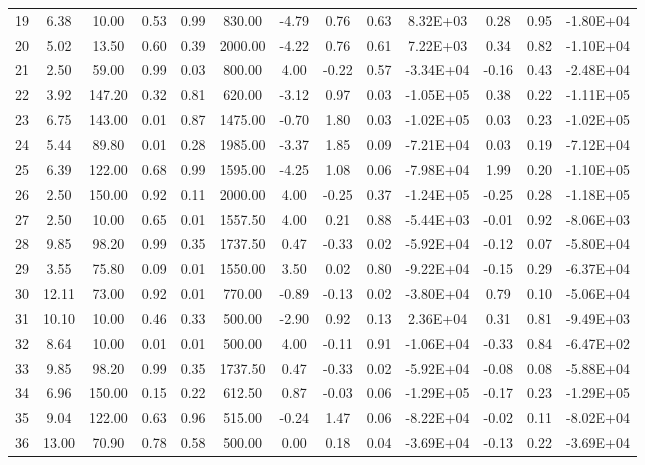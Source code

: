 \begin{landscape}
\begin{center}
\begin{longtable}{|c|c|c|c|c|c|c|c|c|c|c|c|c|}
19 & 6.38  & 10.00  & 0.53 & 0.99 & 830.00  & -4.79 & 0.76  & 0.63 & 8.32E+03  & 0.28  & 0.95 & -1.80E+04 \\
20 & 5.02  & 13.50  & 0.60 & 0.39 & 2000.00 & -4.22 & 0.76  & 0.61 & 7.22E+03  & 0.34  & 0.82 & -1.10E+04 \\
21 & 2.50  & 59.00  & 0.99 & 0.03 & 800.00  & 4.00  & -0.22 & 0.57 & -3.34E+04 & -0.16 & 0.43 & -2.48E+04 \\
22 & 3.92  & 147.20 & 0.32 & 0.81 & 620.00  & -3.12 & 0.97  & 0.03 & -1.05E+05 & 0.38  & 0.22 & -1.11E+05 \\
23 & 6.75  & 143.00 & 0.01 & 0.87 & 1475.00 & -0.70 & 1.80  & 0.03 & -1.02E+05 & 0.03  & 0.23 & -1.02E+05 \\
24 & 5.44  & 89.80  & 0.01 & 0.28 & 1985.00 & -3.37 & 1.85  & 0.09 & -7.21E+04 & 0.03  & 0.19 & -7.12E+04 \\
25 & 6.39  & 122.00 & 0.68 & 0.99 & 1595.00 & -4.25 & 1.08  & 0.06 & -7.98E+04 & 1.99  & 0.20 & -1.10E+05 \\
26 & 2.50  & 150.00 & 0.92 & 0.11 & 2000.00 & 4.00  & -0.25 & 0.37 & -1.24E+05 & -0.25 & 0.28 & -1.18E+05 \\
27 & 2.50  & 10.00  & 0.65 & 0.01 & 1557.50 & 4.00  & 0.21  & 0.88 & -5.44E+03 & -0.01 & 0.92 & -8.06E+03 \\
28 & 9.85  & 98.20  & 0.99 & 0.35 & 1737.50 & 0.47  & -0.33 & 0.02 & -5.92E+04 & -0.12 & 0.07 & -5.80E+04 \\
29 & 3.55  & 75.80  & 0.09 & 0.01 & 1550.00 & 3.50  & 0.02  & 0.80 & -9.22E+04 & -0.15 & 0.29 & -6.37E+04 \\
30 & 12.11 & 73.00  & 0.92 & 0.01 & 770.00  & -0.89 & -0.13 & 0.02 & -3.80E+04 & 0.79  & 0.10 & -5.06E+04 \\
31 & 10.10 & 10.00  & 0.46 & 0.33 & 500.00  & -2.90 & 0.92  & 0.13 & 2.36E+04  & 0.31  & 0.81 & -9.49E+03 \\
32 & 8.64  & 10.00  & 0.01 & 0.01 & 500.00  & 4.00  & -0.11 & 0.91 & -1.06E+04 & -0.33 & 0.84 & -6.47E+02 \\
33 & 9.85  & 98.20  & 0.99 & 0.35 & 1737.50 & 0.47  & -0.33 & 0.02 & -5.92E+04 & -0.08 & 0.08 & -5.88E+04 \\
34 & 6.96  & 150.00 & 0.15 & 0.22 & 612.50  & 0.87  & -0.03 & 0.06 & -1.29E+05 & -0.17 & 0.23 & -1.29E+05 \\
35 & 9.04  & 122.00 & 0.63 & 0.96 & 515.00  & -0.24 & 1.47  & 0.06 & -8.22E+04 & -0.02 & 0.11 & -8.02E+04 \\
36 & 13.00 & 70.90  & 0.78 & 0.58 & 500.00  & 0.00  & 0.18  & 0.04 & -3.69E+04 & -0.13 & 0.22 & -3.69E+04 \\

\end{longtable}
\end{center}
\end{landscape}
